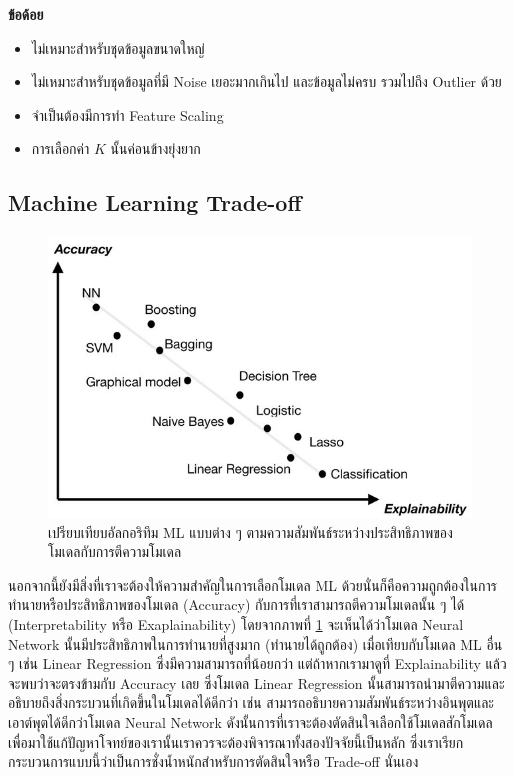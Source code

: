 \noindent \textbf{ข้อด้อย}
%
\begin{itemize}[topsep=0pt,noitemsep]\setlength\itemsep{0.5em}
    \item ไม่เหมาะสำหรับชุดข้อมูลขนาดใหญ่
    
    \item ไม่เหมาะสำหรับชุดข้อมูลที่มี Noise เยอะมากเกินไป และข้อมูลไม่ครบ รวมไปถึง Outlier ด้วย 
    
    \item จำเป็นต้องมีการทำ Feature Scaling
    
    \item การเลือกค่า $K$ นั้นค่อนข้างยุ่งยาก
\end{itemize}

\subsection{Machine Learning Trade-off}
\label{ssec:ml_trade_off}

\begin{figure}[H]
    \centering
    \includegraphics[width=0.9\linewidth,page=2]{fig/ml-trade-off.jpg}
    \caption{เปรียบเทียบอัลกอริทึม ML แบบต่าง ๆ ตามความสัมพันธ์ระหว่างประสิทธิภาพของโมเดลกับการตีความโมเดล}
    \label{fig:ml_traide}
\end{figure}

นอกจากนี้ยังมีสิ่งที่เราจะต้องให้ความสำคัญในการเลือกโมเดล ML ด้วยนั่นก็คือความถูกต้องในการทำนายหรือประสิทธิภาพของโมเดล (Accuracy) 
กับการที่เราสามารถตีความโมเดลนั้น ๆ ได้ (Interpretability หรือ Exaplainability) โดยจากภาพที่ \ref{fig:ml_traide} จะเห็นได้ว่าโมเดล Neural Network นั้นมีประสิทธิภาพในการทำนายที่สูงมาก (ทำนายได้ถูกต้อง) เมื่อเทียบกับโมเดล ML อื่น ๆ เช่น Linear Regression 
ซึ่งมีความสามารถที่น้อยกว่า แต่ถ้าหากเรามาดูที่ Explainability แล้วจะพบว่าจะตรงข้ามกับ Accuracy เลย ซึ่งโมเดล Linear Regression 
นั้นสามารถนำมาตีความและอธิบายถึงสิ่งกระบวนที่เกิดขึ้นในโมเดลได้ดีกว่า เช่น สามารถอธิบายความสัมพันธ์ระหว่างอินพุตและเอาต์พุตได้ดีกว่าโมเดล 
Neural Network ดังนั้นการที่เราจะต้องตัดสินใจเลือกใช้โมเดลสักโมเดลเพื่อมาใช้แก้ปัญหาโจทย์ของเรานั้นเราควรจะต้องพิจารณาทั้งสองปัจจัยนี้เป็นหลัก
ซึ่งเราเรียกกระบวนการแบบนี้ว่าเป็นการชั่งน้ำหนักสำหรับการตัดสินใจหรือ Trade-off นั่นเอง

